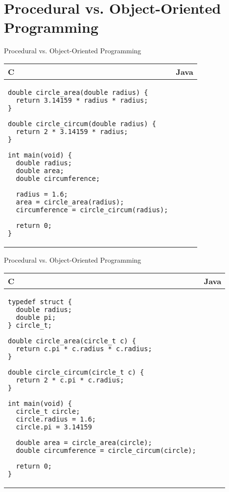 \documentclass[aspectratio=169]{beamer}
\begin{document}
\section{Procedural vs. Object-Oriented Programming}

\begin{frame}[fragile]{Procedural vs. Object-Oriented Programming}
\centering
\begin{tabular}{@{}m{} | m{}@{}}
C					&					Java	\\
\hline
\begin{Verbatim}[fontsize=\tiny]
double circle_area(double radius) {
  return 3.14159 * radius * radius;
}

double circle_circum(double radius) {
  return 2 * 3.14159 * radius;
}

int main(void) {
  double radius;
  double area;
  double circumference;

  radius = 1.6;
  area = circle_area(radius);
  circumference = circle_circum(radius);
	
  return 0;
}
\end{Verbatim}	

\end{tabular}

\end{frame}

\begin{frame}[fragile]{Procedural vs. Object-Oriented Programming}
\centering
\begin{tabular}{@{}m{} | m{}@{}}
C					&					Java	\\
\hline
\begin{Verbatim}[fontsize=\tiny]
typedef struct {
  double radius;
  double pi;
} circle_t;

double circle_area(circle_t c) {
  return c.pi * c.radius * c.radius;
}

double circle_circum(circle_t c) {
  return 2 * c.pi * c.radius;
}

int main(void) {
  circle_t circle;
  circle.radius = 1.6;
  circle.pi = 3.14159
  
  double area = circle_area(circle);
  double circumference = circle_circum(circle);
	
  return 0;
}
\end{Verbatim}	

\end{tabular}

\end{frame}
\end{document}
